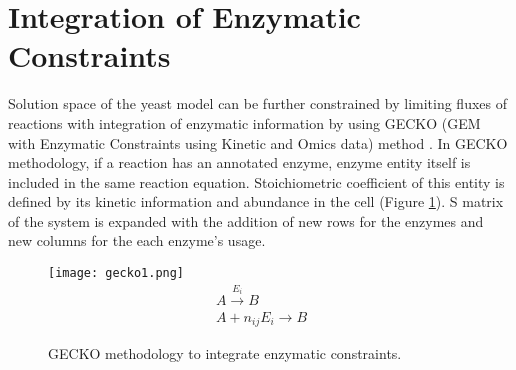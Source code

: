 \section{Integration of Enzymatic Constraints}

Solution space of the yeast model can be further constrained by limiting fluxes of reactions with integration of enzymatic information by using GECKO (GEM with Enzymatic Constraints using Kinetic and Omics data) method \cite{sanchez2017improving}.  In GECKO methodology, if a reaction has an annotated enzyme, enzyme entity itself is included in the same reaction equation. Stoichiometric coefficient of this entity is defined by its kinetic information and abundance in the cell (Figure \ref{fig:gecko1}). S matrix of the system is expanded with the addition of new rows for the enzymes and new columns for the each enzyme's usage.

\begin{figure}[H]
\begin{center}
\texttt{[image: gecko1.png]}
\begin{align}
\label{eq:geckoreaction}
 \ A \xrightarrow{E_i} B \\
 \label{eq:gecko}
 \ A + n_{ij}E_i \xrightarrow{} B
\end{align}
\end{center}
\caption[GECKO methodology to integrate enzymatic constraints\cite{sanchez2017improving}]{GECKO methodology to integrate enzymatic constraints\cite{sanchez2017improving}.}
\label{fig:gecko1}
\end{figure}

